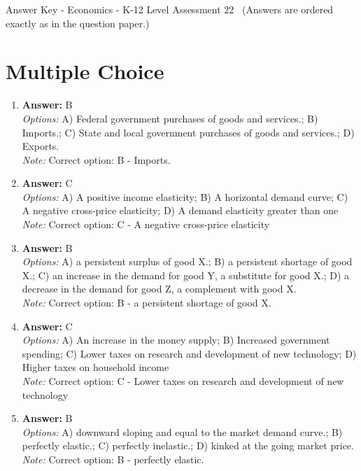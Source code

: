 \documentclass[12pt]{article}
\begin{document}
\begin{center}
Answer Key - Economics - K-12 Level Assessment 22 \
\small (Answers are ordered exactly as in the question paper.)
\end{center}

\section*{Multiple Choice}
\begin{enumerate}[label=\arabic*.]
\item \textbf{Answer:} B
\\ \textit{Options:} A) Federal government purchases of goods and services.; B) Imports.; C) State and local government purchases of goods and services.; D) Exports.
\\ \textit{Note:} Correct option: B - Imports.
\item \textbf{Answer:} C
\\ \textit{Options:} A) A positive income elasticity; B) A horizontal demand curve; C) A negative cross-price elasticity; D) A demand elasticity greater than one
\\ \textit{Note:} Correct option: C - A negative cross-price elasticity
\item \textbf{Answer:} B
\\ \textit{Options:} A) a persistent surplus of good X.; B) a persistent shortage of good X.; C) an increase in the demand for good Y, a substitute for good X.; D) a decrease in the demand for good Z, a complement with good X.
\\ \textit{Note:} Correct option: B - a persistent shortage of good X.
\item \textbf{Answer:} C
\\ \textit{Options:} A) An increase in the money supply; B) Increased government spending; C) Lower taxes on research and development of new technology; D) Higher taxes on household income
\\ \textit{Note:} Correct option: C - Lower taxes on research and development of new technology
\item \textbf{Answer:} B
\\ \textit{Options:} A) downward sloping and equal to the market demand curve.; B) perfectly elastic.; C) perfectly inelastic.; D) kinked at the going market price.
\\ \textit{Note:} Correct option: B - perfectly elastic.
\end{enumerate}
\end{document}

